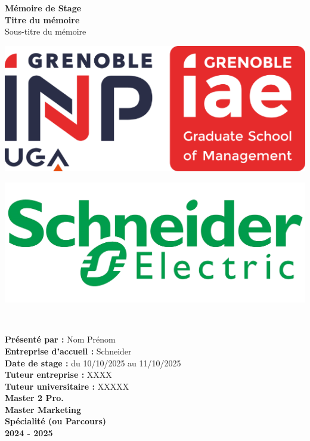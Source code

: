 \begin{center}
    \vspace*{0.5cm}
    {\Huge \textbf{Mémoire de Stage}} \\[1.5cm]
    {\LARGE \textbf{Titre du mémoire}} \\[0.5cm]
    {\large Sous-titre du mémoire} \\[2cm]
    \vspace*{3cm}
    \begin{minipage}{0.4\textwidth}
        \centering
        \includegraphics[width=\textwidth]{images/a0000-img003.png}
    \end{minipage}
    \hfill
    \begin{minipage}{0.4\textwidth}
        \centering
        \includegraphics[width=\textwidth]{images/a0000-img002.png}
    \end{minipage} \\[1cm]
\end{center}
\begin{flushleft}
    \vspace*{2cm}
    \textbf{Présenté par :} Nom Prénom \\
    \textbf{Entreprise d'accueil :} Schneider \\
    \textbf{Date de stage :} du 10/10/2025 au 11/10/2025\\
    \textbf{Tuteur entreprise :} XXXX\\
    \textbf{Tuteur universitaire :} XXXXX \\

    \textbf{Master 2 Pro.} \\
    \textbf{Master Marketing} \\
    \textbf{Spécialité (ou Parcours) }\\
    \textbf{2024 - 2025} \\
\end{flushleft}

\newpage
\mbox{}
\newpage